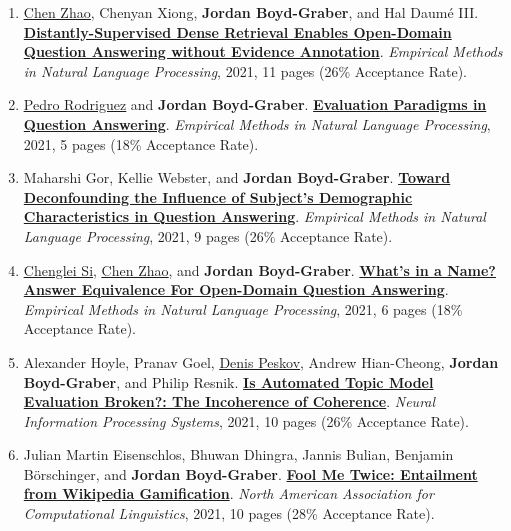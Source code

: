 {\begin{enumerate}
	 \item \underline{\href{https://henryzhao5852.github.io/}{Chen Zhao}}, Chenyan Xiong, {\bf Jordan Boyd-Graber}, and Hal {Daum\'{e} III}.  {\bf \href{http://cs.umd.edu/~jbg//docs/2021_emnlp_weak_dpr.pdf}{Distantly-Supervised Dense Retrieval Enables Open-Domain Question Answering without Evidence Annotation}}.  \emph{Empirical Methods in Natural Language Processing}, 2021, 11 pages (26\% Acceptance Rate).

	 \item \underline{\href{https://www.pedro.ai/}{Pedro Rodriguez}} and {\bf Jordan Boyd-Graber}.  {\bf \href{http://cs.umd.edu/~jbg//docs/2021_emnlp_paradigms.pdf}{Evaluation Paradigms in Question Answering}}.  \emph{Empirical Methods in Natural Language Processing}, 2021, 5 pages (18\% Acceptance Rate).

	 \item Maharshi Gor, Kellie Webster, and {\bf Jordan Boyd-Graber}.  {\bf \href{http://cs.umd.edu/~jbg//docs/2021_emnlp_qa_fairness.pdf}{Toward Deconfounding the Influence of Subject's Demographic Characteristics in Question Answering}}.  \emph{Empirical Methods in Natural Language Processing}, 2021, 9 pages (26\% Acceptance Rate).

	 \item \underline{\href{https://noviscl.github.io}{Chenglei Si}}, \underline{\href{https://henryzhao5852.github.io/}{Chen Zhao}}, and {\bf Jordan Boyd-Graber}.  {\bf \href{http://cs.umd.edu/~jbg//docs/2021_emnlp_answer_equiv.pdf}{What's in a Name? Answer Equivalence For Open-Domain Question Answering}}.  \emph{Empirical Methods in Natural Language Processing}, 2021, 6 pages (18\% Acceptance Rate).

	 \item Alexander Hoyle, Pranav Goel, \underline{\href{https://denis.ai/}{Denis Peskov}}, Andrew Hian-Cheong, {\bf Jordan Boyd-Graber}, and Philip Resnik.  {\bf \href{http://cs.umd.edu/~jbg//docs/2021_neurips_incoherence.pdf}{Is Automated Topic Model Evaluation Broken?: The Incoherence of Coherence}}.  \emph{Neural Information Processing Systems}, 2021, 10 pages (26\% Acceptance Rate).

	 \item Julian Martin Eisenschlos, Bhuwan Dhingra, Jannis Bulian, Benjamin B\"orschinger, and {\bf Jordan Boyd-Graber}.  {\bf \href{http://cs.umd.edu/~jbg//docs/2021_naacl_fm2.pdf}{Fool Me Twice: Entailment from Wikipedia Gamification}}.  \emph{North American Association for Computational Linguistics}, 2021, 10 pages (28\% Acceptance Rate).


\end{enumerate}}
